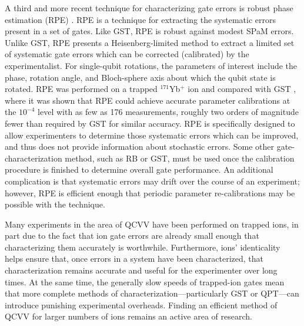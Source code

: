 \documentclass[%
reprint,
 amsmath,amssymb,
]{revtex4-1}
\begin{document}
A third and more recent technique for characterizing gate errors is robust phase estimation (RPE) \cite{kimmel2015robust}. RPE is a technique for extracting the systematic errors present in a set of gates. Like GST, RPE is robust against modest SPaM errors. Unlike GST, RPE presents a Heisenberg-limited method to extract a limited set of systematic gate errors which can be corrected (calibrated) by the experimentalist. For single-qubit rotations, the parameters of interest include the phase, rotation angle, and Bloch-sphere axis about which the qubit state is rotated. RPE was performed on a trapped $^{171}$Yb$^+$ ion and compared with GST \cite{rudinger2017experimental}, where it was shown that RPE could achieve accurate parameter calibrations at the $10^{-4}$ level with as few as 176 measurements, roughly two orders of magnitude fewer than required by GST for similar accuracy. RPE is specifically designed to allow experimenters to determine those systematic errors which can be improved, and thus does not provide information about stochastic errors. Some other gate-characterization method, such as RB or GST, must be used once the calibration procedure is finished to determine overall gate performance. An additional complication is that systematic errors may drift over the course of an experiment; however, RPE is efficient enough that periodic parameter re-calibrations may be possible with the technique.

Many experiments in the area of QCVV have been performed on trapped ions, in part due to the fact that ion gate errors are already small enough that characterizing them accurately is worthwhile. Furthermore, ions' identicality helps ensure that, once errors in a system have been characterized, that characterization remains accurate and useful for the experimenter over long times. At the same time, the generally slow speeds of trapped-ion gates mean that more complete methods of characterization---particularly GST or QPT---can introduce punishing experimental overheads. Finding an efficient method of QCVV for larger numbers of ions remains an active area of research.
\end{document}
